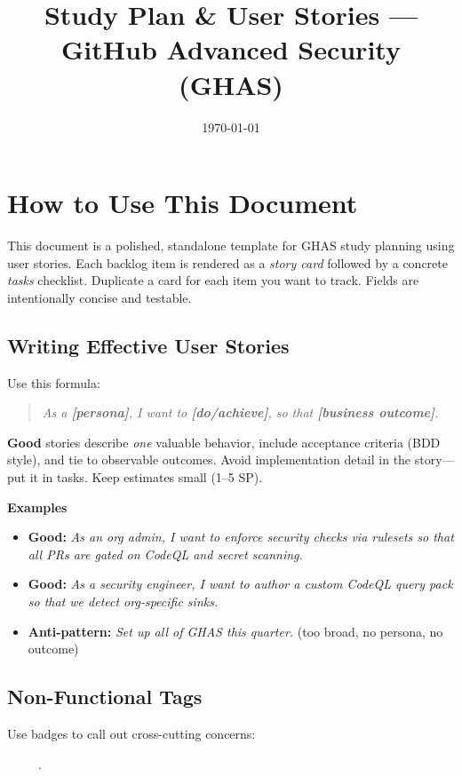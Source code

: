 \documentclass[11pt,a4paper]{article}
\title{\textbf{Study Plan \& User Stories — GitHub Advanced Security (GHAS)}}
\author{}
\date{\today}
\begin{document}
\maketitle
\tableofcontents
\bigskip

\section{How to Use This Document}
This document is a polished, standalone template for GHAS study planning using user stories. Each backlog item is rendered as a \emph{story card} followed by a concrete \emph{tasks} checklist. Duplicate a card for each item you want to track. Fields are intentionally concise and testable.

\subsection*{Writing Effective User Stories}
Use this formula:
\begin{quote}
\textit{As a \textbf{[persona]}, I want to \textbf{[do/achieve]}, so that \textbf{[business outcome]}.}
\end{quote}
\textbf{Good} stories describe \emph{one} valuable behavior, include acceptance criteria (BDD style), and tie to observable outcomes. Avoid implementation detail in the story---put it in tasks. Keep estimates small (1--5 SP).

\textbf{Examples}
\begin{itemize}
  \item \textbf{Good:} \emph{As an org admin, I want to enforce security checks via rulesets so that all PRs are gated on CodeQL and secret scanning.}
  \item \textbf{Good:} \emph{As a security engineer, I want to author a custom CodeQL query pack so that we detect org-specific sinks.}
  \item \textbf{Anti-pattern:} \emph{Set up all of GHAS this quarter.} (too broad, no persona, no outcome)
\end{itemize}

\subsection*{Non-Functional Tags}
Use badges to call out cross-cutting concerns:\par\noindent {}\ \ \ \ \ .
\end{document}
